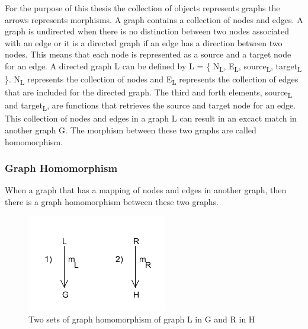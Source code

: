 For the purpose of this thesis the collection of objects represents graphs the
arrows represents morphisms. A graph contains a collection of nodes and edges.
A graph is undirected when there is no distinction between two nodes associated
with an edge or it is a directed graph if an edge has a direction between two
nodes. This means that each node is represented as a source and a target node
for an edge. A directed graph L can be defined by L = \{
N\textsubscript{L}, E\textsubscript{L}, source\textsubscript{L},
target\textsubscript{L} \}. N\textsubscript{L} represents the collection of
nodes and E\textsubscript{L} represents the collection of edges that are
included for the directed graph. The third and forth elements,
source\textsubscript{L} and target\textsubscript{L}, are functions that
retrieves the source and target node for an edge. This collection of nodes and
edges in a graph L can result in an excact match in another graph G. The
morphism between these two graphs are called homomorphism.

\subsubsection*{Graph Homomorphism}

When a graph that has a mapping of nodes and edges in another graph, then there
is a graph homomorphism between these two graphs.

\begin{figure}[H]
	\centering
	\includegraphics[scale=0.7]{./Figures/GraphHomomorphism.png}
	\caption[Basic concepts of graph homomorphism]
	{Two sets of graph homomorphism of graph L in G and R in H}
	\label{fig:graphHomomorphism}
\end{figure}


